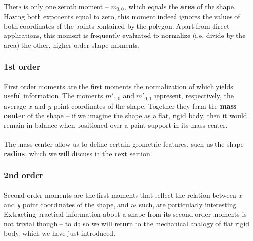 \paragraph*{}
There is only one zeroth moment -- $m_{0,0}$, which equals the \textbf{area} of the shape. Having both exponents equal to zero, this moment indeed ignores the values of both coordinates of the points contained by the polygon. Apart from direct applications, this moment is frequently evaluated to normalize (i.e. divide by the area) the other, higher-order shape moments.

\subsubsection{1st order}

\paragraph*{}
First order moments are the first moments the normalization of which yields useful information. The moments $m'_{1,0}$ and $m'_{0,1}$ represent, respectively, the average $x$ and $y$ point coordinates of the shape. Together they form the \textbf{mass center} of the shape --  if we imagine the shape as a flat, rigid body, then it would remain in balance when positioned over a point support in its mass center.

\paragraph*{}
The mass center allow us to define certain geometric features, such us the shape \textbf{radius}, which we will discuss in the next section.

\subsubsection{2nd order} 

\paragraph*{}
Second order moments are the first moments that reflect the relation between $x$ and $y$ point coordinates of the shape, and as such, are particularly interesting. Extracting practical information about a shape from its second order moments is not trivial though -- to do so we will return to the mechanical analogy of flat rigid body, which we have just introduced.

